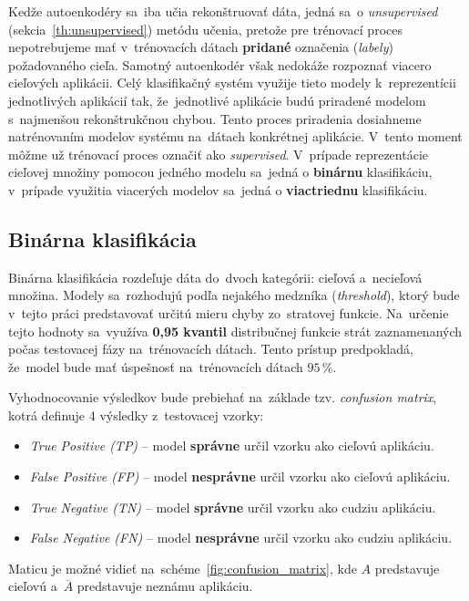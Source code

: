 Kedže autoenkodéry sa~iba učia rekonštruovať dáta, jedná sa~o \textit{unsupervised} (sekcia~\ref{th:unsupervised}) metódu učenia, pretože pre trénovací proces nepotrebujeme mať v~trénovacích dátach \textbf{pridané} označenia (\textit{labely}) požadovaného cieľa. Samotný autoenkodér však nedokáže rozpoznať viacero cieľových aplikácii. Celý klasifikačný systém využije tieto modely k~reprezentícii jednotlivých aplikácií tak, že~jednotlivé aplikácie budú priradené modelom s~najmenšou rekonštrukčnou chybou. Tento proces priradenia dosiahneme natrénovaním modelov systému na~dátach konkrétnej aplikácie. V~tento moment môžme už trénovací proces označiť ako \textit{supervised}. V~prípade reprezentácie cieľovej množiny pomocou jedného modelu sa~jedná o \textbf{binárnu} klasifikáciu, v~prípade využitia viacerých modelov sa~jedná o \textbf{viactriednu} klasifikáciu.

\subsection{Binárna klasifikácia}
Binárna klasifikácia rozdeľuje dáta do~dvoch kategórii: cieľová a~necieľová množina. Modely sa~rozhodujú podľa nejakého medzníka (\textit{threshold}), ktorý bude v~tejto práci predstavovať určitú mieru chyby zo~stratovej funkcie. Na~určenie tejto hodnoty sa~využíva \textbf{0,95 kvantil} distribučnej funkcie strát zaznamenaných počas testovacej fázy na~trénovacích dátach. Tento prístup predpokladá, že~model bude mať úspešnosť na~trénovacích dátach $95\,\%$.

Vyhodnocovanie výsledkov bude prebiehať na~základe tzv. \textit{confusion matrix}, kotrá definuje 4 výsledky z~testovacej vzorky:~\cite{classification}
\begin{itemize}
    \item \textit{True Positive (TP)} -- model \textbf{správne} určil vzorku ako cieľovú aplikáciu.
    \item \textit{False Positive (FP)} -- model \textbf{nesprávne} určil vzorku ako cieľovú aplikáciu.
    \item \textit{True Negative (TN)} -- model \textbf{správne} určil vzorku ako cudziu aplikáciu.
    \item \textit{False Negative (FN)} -- model \textbf{nesprávne} určil vzorku ako cudziu aplikáciu.
\end{itemize}
Maticu je možné vidieť na~schéme~\ref{fig:confusion_matrix}, kde $A$ predstavuje cieľovú a~$\overline{A}$ predstavuje neznámu aplikáciu. 

